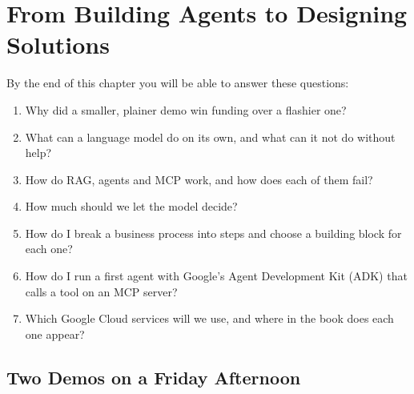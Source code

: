 
\chapter{From Building Agents to Designing Solutions}
\label{ch:foundations}

\begin{chapterquestions}
By the end of this chapter you will be able to answer these questions:
\begin{enumerate}[leftmargin=*,itemsep=2pt]
  \item Why did a smaller, plainer demo win funding over a flashier one?
  \item What can a language model do on its own, and what can it not do without help?
  \item How do RAG, agents and MCP work, and how does each of them fail?
  \item How much should we let the model decide?
  \item How do I break a business process into steps and choose a building block for each one?
  \item How do I run a first agent with Google's Agent Development Kit (ADK) that calls a tool on an MCP server?
  \item Which Google Cloud services will we use, and where in the book does each one appear?
\end{enumerate}
\end{chapterquestions}

\section{Two Demos on a Friday Afternoon}
\label{sec:two-demos}

